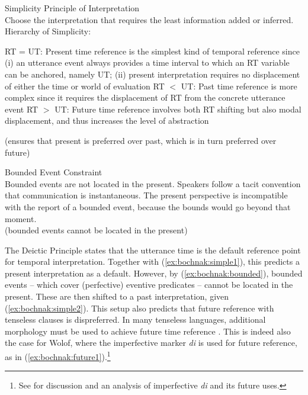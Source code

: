 \documentclass[output=paper,newtxmath,modfonts,nonflat,draftmode]{langsci/langscibook}
\begin{document}
\begin{exe}
\ex\label{ex:bochnak:simplicity} {Simplicity Principle of Interpretation} \\
Choose the interpretation that requires the least information added or
inferred.\\\newpage
Hierarchy of Simplicity:
\begin{xlist}
\ex\label{ex:bochnak:simple1} RT = UT: Present time reference is the simplest kind of temporal reference since (i) an utterance event always provides a time interval to which an RT variable can be anchored, namely UT; (ii) present interpretation requires no displacement of either the time or world of evaluation
\ex\label{ex:bochnak:simple2} RT $<$ UT: Past time reference is more complex since it requires the displacement of RT from the concrete utterance event
\ex\label{ex:bochnak:simple3} RT $>$ UT: Future time reference involves both RT shifting but also modal displacement, and thus increases the level of abstraction
\end{xlist}
(ensures that present is preferred over past, which is in turn preferred over future)
\end{exe}

\ea\label{ex:bochnak:bounded} {Bounded Event Constraint} \\ Bounded events are not located in the present. Speakers follow a tacit convention that communication is instantaneous. The present perspective is incompatible with the report of a bounded event, because the bounds would go beyond that moment. \\
(bounded events cannot be located in the present)
\z

The Deictic Principle states that the utterance time is the default reference point for temporal interpretation. Together with (\ref{ex:bochnak:simple1}), this predicts a present interpretation as a default. However, by (\ref{ex:bochnak:bounded}), bounded events -- which cover (perfective) eventive predicates -- cannot be located in the present. These are then shifted to a past interpretation, given (\ref{ex:bochnak:simple2}). This setup also predicts that future reference with tenseless clauses is dispreferred. In many tenseless languages, additional morphology must be used to achieve future time reference \citep{matthewson06temporal, tonhauser11temporal, bochnak16past}. This is indeed also the case for Wolof, where the imperfective marker \textit{di} is used for future reference, as in (\ref{ex:bochnak:future1}).\footnote{See \citealt{bochnak17deriving} for discussion and an analysis of imperfective \textit{di} and its future uses.}
\end{document}
